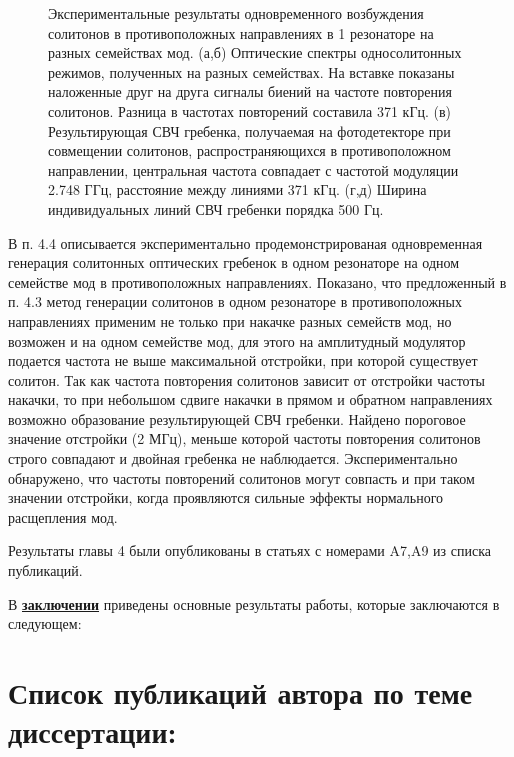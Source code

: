 \begin{figure}[!htb]
\begin{minipage}{1\linewidth}
\end{minipage}
\caption{Экспериментальные результаты одновременного возбуждения солитонов в противоположных направлениях в 1 резонаторе на разных семействах мод. (а,б) Оптические спектры односолитонных режимов, полученных на разных семействах. На вставке показаны наложенные друг на друга сигналы биений на частоте повторения солитонов. Разница в частотах повторений составила 371 кГц. (в) Результирующая СВЧ гребенка, получаемая на фотодетекторе при совмещении солитонов, распространяющихся в противоположном направлении, центральная частота совпадает с частотой модуляции 2.748 ГГц, расстояние между линиями 371 кГц. (г,д) Ширина индивидуальных линий СВЧ гребенки порядка 500 Гц.}
\label{counter_prop_results}
\end{figure}

В п. 4.4 описывается экспериментально продемонстрированая одновременная генерация солитонных оптических гребенок в одном резонаторе на одном семействе мод в противоположных направлениях. Показано, что предложенный в п. 4.3 метод генерации солитонов в одном резонаторе в противоположных направлениях применим не только при накачке разных семейств мод, но возможен и на одном семействе мод, для этого на амплитудный модулятор подается частота не выше максимальной отстройки, при которой существует солитон. Так как частота повторения солитонов зависит от отстройки частоты накачки, то при небольшом сдвиге накачки в прямом и обратном направлениях возможно образование результирующей СВЧ гребенки. Найдено пороговое значение отстройки (2 МГц), меньше которой частоты повторения солитонов строго совпадают и двойная гребенка не наблюдается. Экспериментально обнаружено, что частоты повторений солитонов могут совпасть и при таком значении отстройки, когда проявляются сильные эффекты нормального расщепления мод.

Результаты главы 4 были опубликованы в статьях с номерами A7,A9 из списка публикаций.

В \underline{\textbf{заключении}} приведены основные результаты работы, которые заключаются в следующем:





\section*{Список публикаций автора по теме диссертации:}

